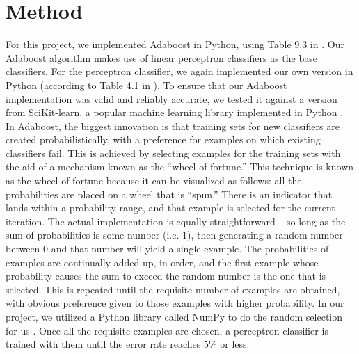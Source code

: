 \documentclass{article}
\begin{document}
\section{Method}

For this project, we implemented Adaboost in Python, using Table 9.3 in \cite{kubat}. Our Adaboost algorithm makes use of linear perceptron classifiers as the base classifiers. For the perceptron classifier, we again implemented our own version in Python (according to Table 4.1 in \cite{kubat}). To ensure that our Adaboost implementation was valid and reliably accurate, we tested it against a version from SciKit-learn, a popular machine learning library implemented in Python \cite{scikit}. \\

In Adaboost, the biggest innovation is that training sets for new classifiers are created probabilistically, with a preference for examples on which existing classifiers fail. This is achieved by selecting examples for the training sets with the aid of a mechanism known as the ``wheel of fortune.'' This technique is known as the wheel of fortune because it can be visualized as follows: all the probabilities are placed on a wheel that is ``spun.'' There is an indicator that lands within a probability range, and that example is selected for the current iteration. The actual implementation is equally straightforward -- so long as the sum of probabilities is some number (i.e. 1), then generating a random number between 0 and that number will yield a single example. The probabilities of examples are continually added up, in order, and the first example whose probability causes the sum to exceed the random number is the one that is selected. This is repeated until the requisite number of examples are obtained, with obvious preference given to those examples with higher probability. In our project, we utilized a Python library called NumPy to do the random selection for us \cite{numpy}. Once all the requisite examples are chosen, a perceptron classifier is trained with them until the error rate reaches 5\% or less. \\
\end{document}
